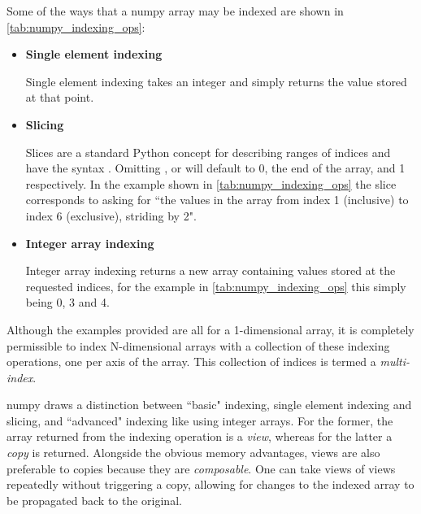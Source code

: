 \documentclass[thesis]{subfiles}
\begin{document}
Some of the ways that a numpy array may be indexed are shown in \cref{tab:numpy_indexing_ops}:

\begin{itemize}
  \item \textbf{Single element indexing}

    Single element indexing takes an integer and simply returns the value stored at that point.

  \item \textbf{Slicing}

    Slices are a standard Python concept for describing ranges of indices and have the syntax .
    Omitting ,  or  will default to 0, the end of the array, and 1 respectively.
    In the example shown in \cref{tab:numpy_indexing_ops} the slice \pycode{[1:6:2]} corresponds to asking for ``the values in the array from index 1 (inclusive) to index 6 (exclusive), striding by 2".

  \item \textbf{Integer array indexing}

    Integer array indexing returns a new array containing values stored at the requested indices, for the example in \cref{tab:numpy_indexing_ops} this simply being 0, 3 and 4.

\end{itemize}


Although the examples provided are all for a 1-dimensional array, it is completely permissible to index N-dimensional arrays with a collection of these indexing operations, one per axis of the array.
This collection of indices is termed a \textit{multi-index}.

numpy draws a distinction between ``basic" indexing, single element indexing and slicing, and ``advanced" indexing like using integer arrays.
For the former, the array returned from the indexing operation is a \textit{view}, whereas for the latter a \textit{copy} is returned.
Alongside the obvious memory advantages, views are also preferable to copies because they are \textit{composable}.
One can take views of views repeatedly without triggering a copy, allowing for changes to the indexed array to be propagated back to the original.

\end{document}
